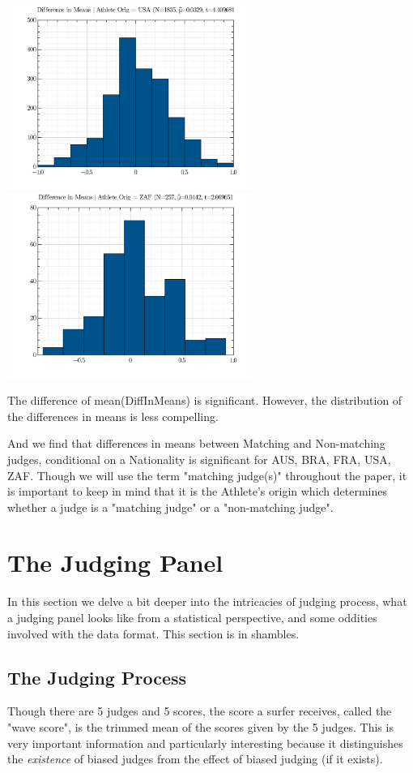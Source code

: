 \documentclass{article}
\theoremstyle{definition}
\begin{document}
\includegraphics[width=8cm]{./src/visuals/DistOfDiffInMeansForUSA.png}
\includegraphics[width=8cm]{./src/visuals/DistOfDiffInMeansForZAF.png}


The difference of mean(DiffInMeans) is significant. However, the distribution of the differences in means is less compelling. 

And we find that differences in means between Matching and Non-matching judges, conditional on a Nationality is significant for AUS, BRA, FRA, USA, ZAF. Though we will use the term "matching judge(s)" throughout the paper, it is important to keep in mind that it is the Athlete's origin which determines whether a judge is a "matching judge" or a "non-matching judge".

\section{The Judging Panel}
In this section we delve a bit deeper into the intricacies of judging process, what a judging panel looks like from a statistical perspective, and some oddities involved with the data format. This section is in shambles.
\subsection{The Judging Process}
Though there are 5 judges and 5 scores, the score a surfer receives, called the "wave score", is the trimmed mean of the scores given by the 5 judges. This is very important information and particularly interesting because it distinguishes the \textit{existence} of biased judges from the effect of biased judging (if it exists).
\end{document}

